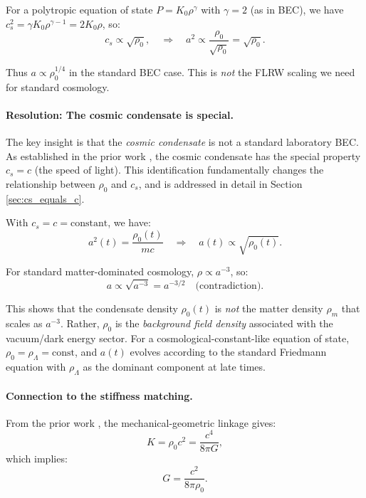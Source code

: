 For a polytropic equation of state $P = K_0 \rho^\gamma$ with $\gamma = 2$ (as in BEC), we have $c_s^2 = \gamma K_0 \rho^{\gamma-1} = 2K_0 \rho$, so:
\begin{equation}
c_s \propto \sqrt{\rho_0}, \quad \Rightarrow \quad a^2 \propto \frac{\rho_0}{\sqrt{\rho_0}} = \sqrt{\rho_0}.
\end{equation}

Thus $a \propto \rho_0^{1/4}$ in the standard BEC case. This is \emph{not} the FLRW scaling we need for standard cosmology.

\paragraph{Resolution: The cosmic condensate is special.}
The key insight is that the \emph{cosmic condensate} is not a standard laboratory BEC. As established in the prior work \cite{SkavbergMechG2025}, the cosmic condensate has the special property $c_s = c$ (the speed of light). This identification fundamentally changes the relationship between $\rho_0$ and $c_s$, and is addressed in detail in Section \ref{sec:cs_equals_c}.

With $c_s = c = \text{constant}$, we have:
\begin{equation}
\label{eq:scale_factor_cosmic}
a^2(t) = \frac{\rho_0(t)}{m c} \quad \Rightarrow \quad a(t) \propto \sqrt{\rho_0(t)}.
\end{equation}

For standard matter-dominated cosmology, $\rho \propto a^{-3}$, so:
\begin{equation}
a \propto \sqrt{a^{-3}} = a^{-3/2} \quad \text{(contradiction)}.
\end{equation}

This shows that the condensate density $\rho_0(t)$ is \emph{not} the matter density $\rho_m$ that scales as $a^{-3}$. Rather, $\rho_0$ is the \emph{background field density} associated with the vacuum/dark energy sector. For a cosmological-constant-like equation of state, $\rho_0 = \rho_\Lambda = \text{const}$, and $a(t)$ evolves according to the standard Friedmann equation with $\rho_\Lambda$ as the dominant component at late times.

\paragraph{Connection to the stiffness matching.}
From the prior work \cite{SkavbergMechG2025}, the mechanical-geometric linkage gives:
\begin{equation}
\label{eq:stiffness_matching}
K = \rho_0 c^2 = \frac{c^4}{8\pi G},
\end{equation}
which implies:
\begin{equation}
\label{eq:G_from_rho}
G = \frac{c^2}{8\pi \rho_0}.
\end{equation}

